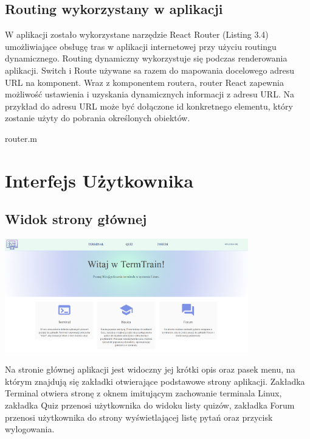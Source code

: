 \documentclass[10pt,a4paper]{report}
\begin{document}
\begin{adjustwidth}{2cm}{2cm}
\subsection{Routing wykorzystany w aplikacji}
\begin{minipage}{1\linewidth}
W aplikacji zostało wykorzystane narzędzie React Router (Listing 3.4) umożliwiające obsługę tras w aplikacji internetowej przy użyciu routingu dynamicznego. Routing dynamiczny wykorzystuje się podczas renderowania aplikacji. Switch i Route używane sa razem do mapowania docelowego adresu URL na komponent. Wraz z komponentem routera, router React zapewnia możliwość ustawienia i uzyskania dynamicznych informacji z adresu URL. Na przykład do adresu URL może być dołączone id konkretnego elementu, który zostanie użyty do pobrania określonych obiektów. 
\end{minipage}
\begin{center}
\begin{lstinputlisting}[ escapeinside=``,caption={\textit{Routing użyty w projekcie}}]
{router.m}
\end{lstinputlisting}
\end{center}
\newpage
\section{Interfejs Użytkownika}
\subsection{Widok strony głównej}
\begin{minipage}{\linewidth}
\begin{center}
  \includegraphics[width=400px]{project/main_page.png}
\end{center}
\end{minipage}
\begin{minipage}{1\linewidth}
\vspace{0.3cm}
Na stronie głównej aplikacji jest widoczny jej krótki opis oraz
pasek menu, na którym znajdują się zakładki otwierające podstawowe strony aplikacji.
Zakładka Terminal otwiera stronę z oknem  imitującym zachowanie terminala Linux, zakładka Quiz przenosi
użytkownika do widoku listy quizów, zakładka Forum przenosi użytkownika do strony
wyświetlającej listę pytań oraz przycisk wylogowania.
\end{minipage}

\end{adjustwidth}
\end{document}

